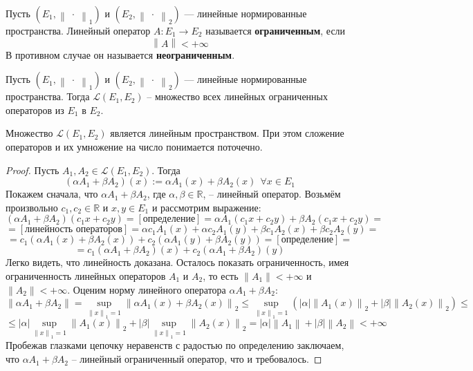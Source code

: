 \documentclass[11pt]{article}
\begin{document}
\begin{definition}
    Пусть $(E_1, \left\lVert \; \cdot \; \right\rVert_1)$ и $(E_2, \left\lVert \; \cdot \;
    \right\rVert_2)$ --- линейные нормированные пространства. Линейный оператор $A \colon E_1 \to E_2$ называется 
    \textbf{ограниченным}, если \[\left\lVert A \right\rVert < +\infty\]
    В противном случае он называется \textbf{неограниченным}.
\end{definition}

\begin{definition}
    Пусть $(E_1, \left\lVert \; \cdot \; \right\rVert_1)$ и $(E_2, \left\lVert \; \cdot \;
    \right\rVert_2)$ --- линейные нормированные пространства. Тогда $\mathcal{L}(E_1, E_2)$ -- множество всех линейных 
    ограниченных операторов из $E_1$ в $E_2$.
\end{definition}

\begin{lemma}
    Множество $\mathcal{L}(E_1, E_2)$ является линейным пространством. При этом сложение операторов и их 
    умножение на число понимается поточечно.
\end{lemma}

\begin{proof}
    Пусть $A_1, A_2 \in \mathcal{L}(E_1, E_2)$. Тогда 
    \[(\alpha A_1 + \beta A_2)(x) := \alpha A_1(x) + \beta A_2(x) \ \ \forall x \in E_1\]
    Покажем сначала, что $\alpha A_1 + \beta A_2$, где $\alpha, \beta \in \mathbb{R}$, -- линейный оператор. Возьмём 
    произвольно $c_1, c_2 \in \mathbb{R}$ и $x, y \in E_1$ и рассмотрим выражение: 
    \[(\alpha A_1 + \beta A_2)(c_1x + c_2y) = [\text{определение}] = \alpha A_1(c_1x + c_2y) + \beta A_2(c_1x + c_2y) =\]
    \[= [\text{линейность операторов}] = \alpha c_1A_1(x) + \alpha c_2A_1(y) + \beta c_1A_2(x) + \beta c_2A_2(y) =\]
    \[= c_1\left(\alpha A_1(x) + \beta A_2(x)\right) + c_2\left(\alpha A_1(y) + \beta A_2(y)\right) = [\text{определение}] =\]
    \[= c_1(\alpha A_1 + \beta A_2)(x) + c_2(\alpha A_1 + \beta A_2)(y)\]
    Легко видеть, что линейность доказана. Осталось показать ограниченность, имея ограниченность линейных операторов $A_1$ и $A_2$, то есть $\left\lVert A_1 \right\rVert < +\infty$ и 
    $\left\lVert A_2 \right\rVert < +\infty$. Оценим норму линейного оператора $\alpha A_1 + \beta A_2$:
    \[\left\lVert \alpha A_1 + \beta A_2 \right\rVert = \sup_{\left\lVert x \right\rVert_1 = 1} \left\lVert \alpha A_1(x) + \beta A_2(x) \right\rVert_2 \leq \sup_{\left\lVert x \right\rVert_1 = 1} (\left\lvert \alpha \right\rvert \left\lVert A_1(x) \right\rVert_2 + \left\lvert \beta \right\rvert \left\lVert A_2(x) \right\rVert_2) \leq\]
    \[\leq \left\lvert \alpha \right\rvert \sup_{\left\lVert x \right\rVert_1 = 1} \left\lVert A_1(x) \right\rVert_2 + \left\lvert \beta \right\rvert \sup_{\left\lVert x \right\rVert_1 = 1} \left\lVert A_2(x) \right\rVert_2 = \left\lvert \alpha \right\rvert \left\lVert A_1 \right\rVert + \left\lvert \beta \right\rvert \left\lVert A_2 \right\rVert < +\infty\]
    Пробежав глазками цепочку неравенств с радостью по определению заключаем, что $\alpha A_1 + \beta A_2$ -- линейный ограниченный оператор, что и требовалось.
\end{proof}
\end{document}
